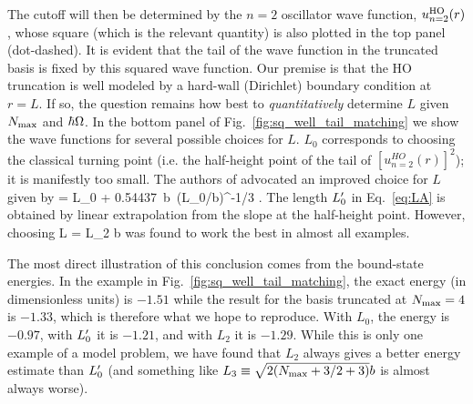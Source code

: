 	The cutoff will then be determined by the $n=2$ oscillator wave
	function, $u_{n=2}^{\rm HO}(r)$, whose square (which is the relevant
	quantity) is also plotted in the top panel (dot-dashed).  It is
	evident that the tail of the wave function in the truncated basis is
	fixed by this squared wave function.  Our premise is that the HO truncation
	is well modeled by a hard-wall (Dirichlet) boundary condition at $r=L$.
	If so, the question remains how best to \emph{quantitatively} determine $L$
	given	${N_{\mathrm{max}}}$ and $\hbar\Omega$.  In the bottom panel of
	Fig.~\ref{fig:sq_well_tail_matching} we show the wave functions	for several
	possible choices for $L$.
	$L_0$ corresponds to choosing the classical
	turning point (i.e. the half-height point of the tail of
	$[u^{HO}_{n=2}(r)]^2$); it is manifestly too small.  The authors of
	\cite{Furnstahl2012} advocated an improved choice for $L$ given by
	\beq
	\LA = L_0 + 0.54437\, b\, (L_0/b)^{-1/3} \;.
  \label{eq:LA}
	\eeq
	The length $L'_0$ in Eq.~\eqref{eq:LA} is obtained by linear extrapolation
	from the slope at the half-height point.
	However, choosing
	\beq
	L = L_2 \equiv {}b
	\label{eq:L2_def}
	\eeq
	was found to work the best in almost all examples.

	The most direct illustration of this conclusion comes from the
	bound-state energies.  In the example in Fig.~\ref{fig:sq_well_tail_matching},
	the exact energy (in dimensionless units) is $-1.51$ while the
	result for the basis truncated at ${N_{\mathrm{max}}}=4$ is $-1.33$, which is therefore
	what we	hope to reproduce.  With $L_0$, the energy is $-0.97$, with $L'_0$ it
	is $-1.21$, and with $L_2$ it is $-1.29$.  While this is only one
	example of a model problem, we have found that $L_2$ always gives a
	better energy estimate than $L'_0$ (and something like
	$L_3 \equiv \sqrt{2 ({N_{\mathrm{max}}} + 3/2 + 3)}b$ is almost always worse).

